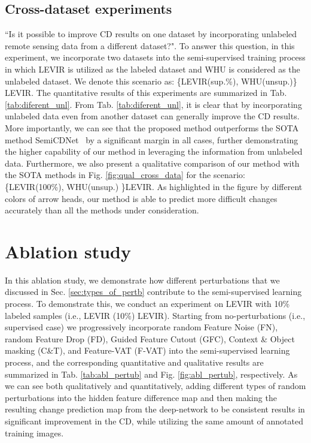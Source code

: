 \documentclass[runningheads]{llncs}
\begin{document}
\subsection{Cross-dataset experiments}
\vspace{-3mm}
``Is it possible to improve CD results on one dataset by incorporating unlabeled remote sensing data from a different dataset?". To answer this question, in this experiment, we incorporate two datasets into the semi-supervised training process in which LEVIR is utilized as the labeled dataset and WHU is considered as the unlabeled dataset. We denote this scenario as: \{LEVIR(sup.\%), WHU(unsup.)\}  LEVIR. The quantitative results of this experiments are summarized in Tab. \ref{tab:diferent_unl}. From Tab. \ref{tab:diferent_unl}, it is clear that by incorporating unlabeled data even from another dataset can generally improve the CD results. More importantly, we can see that the proposed method outperforms the SOTA method SemiCDNet~\cite{SemiCDNet} by a significant margin in all cases, further demonstrating the higher capability of our method in leveraging the information from unlabeled data. Furthermore, we also present a qualitative comparison of our method with the SOTA methods in Fig. \ref{fig:qual_cross_data} for the scenario: \{LEVIR(100\%), WHU(unsup.) \}LEVIR. As highlighted in the figure by different colors of arrow heads, our method is able to predict more difficult changes accurately than all the methods under consideration.    

\section{Ablation study}
\vspace{-1mm}
In this ablation study, we demonstrate how different perturbations that we discussed in Sec. \ref{sec:types_of_pertb} contribute to the semi-supervised learning process. To demonstrate this, we conduct an experiment on LEVIR with 10\% labeled samples (i.e., LEVIR (10\%)  LEVIR). Starting from no-perturbations (i.e., supervised case) we progressively incorporate random Feature Noise (FN), random Feature Drop (FD), Guided Feature Cutout (GFC), Context \& Object masking (C\&T), and Feature-VAT (F-VAT) into the semi-supervised learning process, and the corresponding quantitative and qualitative results are summarized in Tab. \ref{tab:abl_pertub} and Fig. \ref{fig:abl_pertub}, respectively. As we can see both qualitatively and quantitatively, adding different types of random perturbations into the hidden feature difference map and then making the resulting change prediction map from the deep-network to be consistent results in significant improvement in the CD, while utilizing the same amount of annotated training images. 
\end{document}
